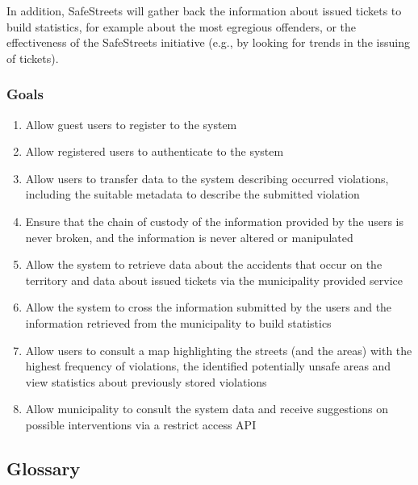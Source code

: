 	In addition, SafeStreets will gather back the information about issued tickets to build statistics, for example about the most egregious offenders, or the effectiveness of the SafeStreets initiative (e.g., by looking for trends in the issuing of tickets).

\subsubsection{Goals}
	\label{sec:goals}
	\begin{enumerate}[label=\textbf{G\arabic*}]
		\item \label{goal:register} Allow guest users to register to the system
		\item \label{goal:login} Allow registered users to authenticate to the system
		\item \label{goal:userTransfer} Allow users to transfer data to the system describing occurred violations, including the suitable metadata to describe the submitted violation
		\item \label{goal:avoidLeaks} Ensure that the chain of custody of the information provided by the users is never broken, and the information is never altered or manipulated
		\item \label{goal:municipalityTransfer} Allow the system to retrieve data about the accidents that occur on the territory and data about issued tickets via the municipality provided service
		\item \label{goal:statistics} Allow the system to cross the information submitted by the users and the information retrieved from the municipality to build statistics
		\item \label{goal:consultMap} Allow users to consult a map highlighting the streets (and the areas) with the highest frequency of violations, the identified potentially unsafe areas and view statistics about previously stored violations
		\item \label{retrieveData} Allow municipality to consult the system data and receive suggestions on possible interventions via a restrict access API 

	\end{enumerate}

\subsection{Glossary}
